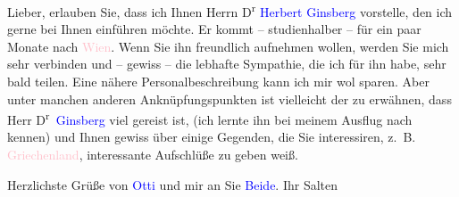 \pstart
           Lieber, erlauben Sie, dass ich Ihnen Herrn D\textsuperscript{r}{ }\textcolor{blue}{Herbert Ginsberg}{}\ledrightnote{\textcolor{blue}{Herbert Ginsberg}} vorstelle, den ich gerne bei
               Ihnen einführen möchte. Er kommt – studienhalber – für ein paar Monate nach \textcolor{pink}{Wien}{}\ledrightnote{\textcolor{pink}{Wien}}. Wenn Sie ihn freundlich aufnehmen wollen,
               werden Sie mich sehr verbinden und – gewiss – die lebhafte Sympathie, die ich für ihn
               habe, sehr bald teilen. Eine nähere Personalbeschreibung kann ich mir wol sparen.
               Aber unter manchen anderen Anknüpfungspunkten ist vielleicht der zu erwähnen, dass
               Herr D\textsuperscript{r} \textcolor{blue}{Ginsberg}{}\ledrightnote{\textcolor{blue}{Herbert Ginsberg}}
               viel gereist ist, (ich lernte ihn bei meinem Ausflug nach \label{K_L03417-1v}\label{K_L03417-1h}
               kennen) und Ihnen gewiss über einige Gegenden, die Sie interessiren, z. B. \textcolor{pink}{Griechenland}{}\ledrightnote{\textcolor{pink}{Griechenland}}, interessante Aufschlüße zu geben
               weiß.\pend
           
\pstart
           Herzlichste Grüße von \textcolor{blue}{Otti}{}\ledrightnote{\textcolor{blue}{Ottilie Salten}} und mir an Sie \textcolor{blue}{Beide}{}\ledrightnote{{$\rightarrow$}\textcolor{blue}{Olga Schnitzler}}.\pend
           \pstart Ihr \spacefill\mbox{Salten}\pend{}\endnumbering{}  
      